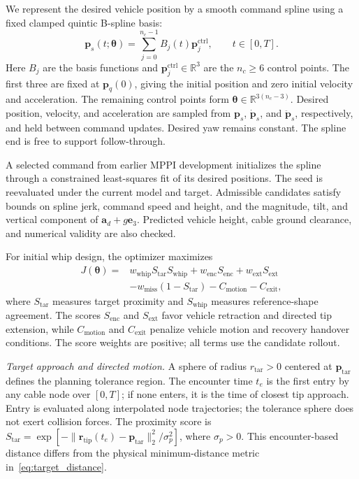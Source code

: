 \documentclass[letterpaper, 10 pt, conference]{ieeeconf}
\begin{document}
We represent the desired vehicle position by a smooth command spline
using a fixed clamped quintic B-spline basis:
\begin{equation}
\mathbf p_s(t;\boldsymbol\theta)
=\sum_{j=0}^{n_c-1}B_j(t)\mathbf p_j^{\mathrm{ctrl}},
\qquad t\in[0,T].
\label{eq:spline_reference}
\end{equation}
Here $B_j$ are the basis functions and $\mathbf p_j^{\mathrm{ctrl}}\in\mathbb R^3$
are the $n_c\geq6$ control points. The first three are fixed at
$\mathbf p_q(0)$, giving the initial position and zero initial
velocity and acceleration.
The remaining control points form
$\boldsymbol\theta\in\mathbb R^{3(n_c-3)}$.
Desired position, velocity, and acceleration are sampled from
$\mathbf p_s$, $\dot{\mathbf p}_s$, and $\ddot{\mathbf p}_s$,
respectively, and held between command updates. Desired yaw
remains constant. The spline end is free to support follow-through.

A selected command from earlier MPPI development initializes the
spline through a constrained least-squares fit of its desired
positions. The seed is reevaluated under the current model and
target. Admissible candidates satisfy bounds on spline jerk,
command speed and height, and
the magnitude, tilt, and vertical component of
$\mathbf a_d+g\mathbf e_3$. Predicted vehicle height, cable
ground clearance, and numerical validity are also checked.

For initial whip design, the optimizer maximizes
\begin{equation}
\begin{aligned}
J(\boldsymbol\theta)
={}&w_{\mathrm{whip}}S_{\mathrm{tar}}S_{\mathrm{whip}}
+w_{\mathrm{enc}}S_{\mathrm{enc}}+w_{\mathrm{ext}}S_{\mathrm{ext}}\\
&-w_{\mathrm{miss}}(1-S_{\mathrm{tar}})
-C_{\mathrm{motion}}-C_{\mathrm{exit}},
\end{aligned}
\label{eq:planning_score}
\end{equation}
where $S_{\mathrm{tar}}$ measures target proximity and $S_{\mathrm{whip}}$
measures reference-shape agreement. The scores $S_{\mathrm{enc}}$
and $S_{\mathrm{ext}}$ favor vehicle retraction and directed tip
extension, while $C_{\mathrm{motion}}$ and $C_{\mathrm{exit}}$
penalize vehicle motion and recovery handover conditions.
The score weights are positive; all terms use the candidate rollout.

\noindent\emph{Target approach and directed motion.}
A sphere of radius $r_{\mathrm{tar}}>0$ centered at
$\mathbf p_{\mathrm{tar}}$ defines the planning tolerance region.
The encounter time $t_e$ is the first entry by any cable node
over $[0,T]$; if none enters, it is the time of closest tip
approach. Entry is evaluated along interpolated node trajectories;
the tolerance sphere does not exert collision forces. The proximity
score is $S_{\mathrm{tar}}=\exp[-\|\mathbf r_{\mathrm{tip}}(t_e)
-\mathbf p_{\mathrm{tar}}\|_2^2/\sigma_p^2]$, where $\sigma_p>0$. This encounter-based distance differs from the
physical minimum-distance metric in~\eqref{eq:target_distance}.
\end{document}
